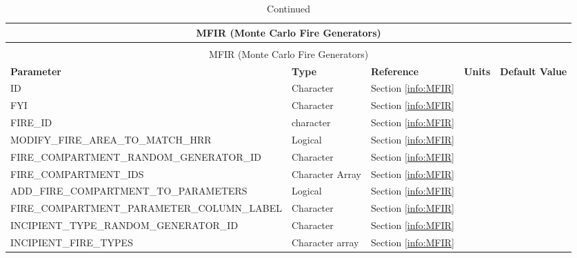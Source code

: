 \begin{landscape}
\noindent
\renewcommand{\tabcolsep}{.1in}
\begin{longtable}{|l|l|l|l|l|}
\caption[Monte Carlo Fire Generators ({\ct MFIR} namelist group)]{For more information see Section~\ref{info:MFIR}.}
\label{tbl:MFIR} \\
\hline
\multicolumn{5}{|c|}{{\ct MFIR} (Monte Carlo Fire Generators)} \\
\hline \hline
\endfirsthead
\caption[]{Continued} \\
\hline
\multicolumn{5}{|c|}{{\ct MFIR} (Monte Carlo Fire Generators)} \\
\hline \hline
\endhead
\parbox{1.5in}{\bf Parameter}    & \parbox{1in}{\bf Type}  & \parbox{1in}{\bf Reference}  & \parbox{1in}{\bf Units}  & \parbox{1in}{\bf Default Value} \\ \hline
{\ct ID}                                                    & Character         & Section \ref{info:MFIR}   &      &     \\ \hline
{\ct FYI}                                                   & Character         & Section \ref{info:MFIR}   &      &     \\ \hline
{\ct FIRE\_ID}                                              & character         & Section \ref{info:MFIR}   &      &     \\ \hline
{\ct MODIFY\_FIRE\_AREA\_TO\_MATCH\_HRR}                    & Logical           & Section \ref{info:MFIR}   &      &     \\ \hline
{\ct FIRE\_COMPARTMENT\_RANDOM\_GENERATOR\_ID}              & Character         & Section \ref{info:MFIR}   &      &     \\ \hline
{\ct FIRE\_COMPARTMENT\_IDS}                                & Character Array   & Section \ref{info:MFIR}   &      &     \\ \hline
{\ct ADD\_FIRE\_COMPARTMENT\_TO\_PARAMETERS}                & Logical           & Section \ref{info:MFIR}   &      &     \\ \hline
{\ct FIRE\_COMPARTMENT\_PARAMETER\_COLUMN\_LABEL}           & Character         & Section \ref{info:MFIR}   &      &     \\ \hline \hline
{\ct INCIPIENT\_TYPE\_RANDOM\_GENERATOR\_ID}                & Character         & Section \ref{info:MFIR}   &      &     \\ \hline
{\ct INCIPIENT\_FIRE\_TYPES}                                & Character array   & Section \ref{info:MFIR}   &      &     \\ \hline

\end{longtable}
\end{landscape}
